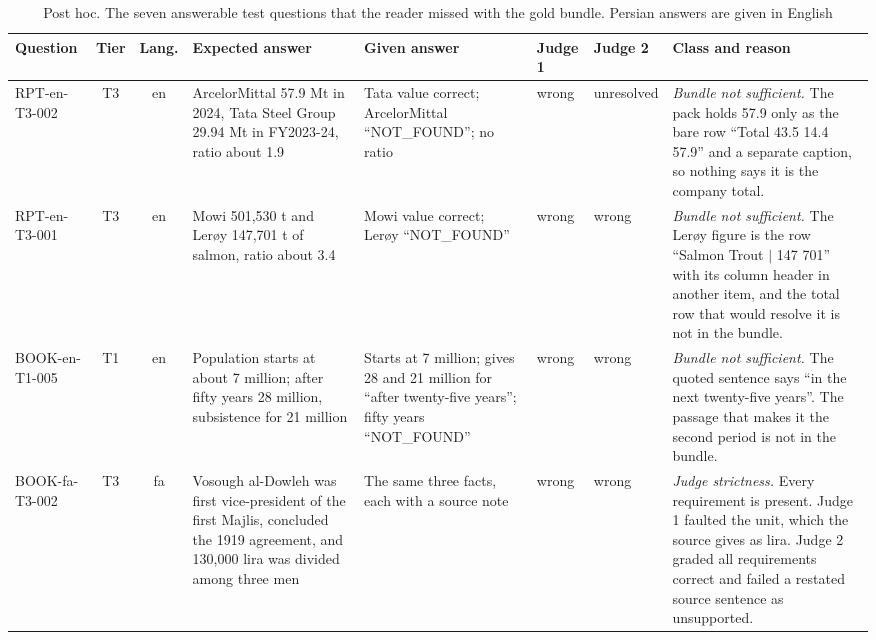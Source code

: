 \begin{table}[tp]
\caption{Post hoc. The seven answerable test questions that the reader missed with the gold bundle. Persian answers are given in English}
\label{tab:goldmiss}
\centering
\scriptsize
\setlength{\tabcolsep}{2.5pt}
\begin{tabularx}{\textwidth}{@{}>{\raggedright\arraybackslash}p{2.2cm}cc>{\raggedright\arraybackslash}X>{\raggedright\arraybackslash}X>{\raggedright\arraybackslash}p{1.15cm}>{\raggedright\arraybackslash}p{1.15cm}>{\raggedright\arraybackslash}p{4.6cm}@{}}
\toprule
Question & Tier & Lang. & Expected answer & Given answer & Judge 1 & Judge 2 & Class and reason \\
\midrule
RPT-en-T3-002 & T3 & en & ArcelorMittal 57.9 Mt in 2024, Tata Steel Group 29.94 Mt in FY2023-24, ratio about 1.9 & Tata value correct; ArcelorMittal ``NOT\_FOUND''; no ratio & wrong & unresolved & \emph{Bundle not sufficient.} The pack holds 57.9 only as the bare row ``Total 43.5 14.4 57.9'' and a separate caption, so nothing says it is the company total. \\
RPT-en-T3-001 & T3 & en & Mowi 501,530 t and Ler\o y 147,701 t of salmon, ratio about 3.4 & Mowi value correct; Ler\o y ``NOT\_FOUND'' & wrong & wrong & \emph{Bundle not sufficient.} The Ler\o y figure is the row ``Salmon Trout $|$ 147 701'' with its column header in another item, and the total row that would resolve it is not in the bundle. \\
BOOK-en-T1-005 & T1 & en & Population starts at about 7 million; after fifty years 28 million, subsistence for 21 million & Starts at 7 million; gives 28 and 21 million for ``after twenty-five years''; fifty years ``NOT\_FOUND'' & wrong & wrong & \emph{Bundle not sufficient.} The quoted sentence says ``in the next twenty-five years''. The passage that makes it the second period is not in the bundle. \\
BOOK-fa-T3-002 & T3 & fa & Vosough al-Dowleh was first vice-president of the first Majlis, concluded the 1919 agreement, and 130,000 lira was divided among three men & The same three facts, each with a source note & wrong & wrong & \emph{Judge strictness.} Every requirement is present. Judge 1 faulted the unit, which the source gives as lira. Judge 2 graded all requirements correct and failed a restated source sentence as unsupported. \\
\bottomrule
\end{tabularx}
\end{table}

